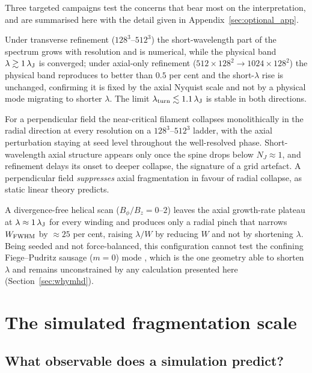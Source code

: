 \documentclass[usenatbib,twoside,twocolumn]{mnras}
\begin{document}
Three targeted campaigns test the concerns that bear most on the interpretation, and are summarised here with the detail given in Appendix~\ref{sec:optional_app}.

Under transverse refinement ($128^3$--$512^3$) the short-wavelength part of the spectrum grows with resolution and is numerical, while the physical band $\lambda\gtrsim1\,\lambda_{\rm J}$ is converged; under axial-only refinement ($512\times128^2\to1024\times128^2$) the physical band reproduces to better than $0.5$ per cent and the short-$\lambda$ rise is unchanged, confirming it is fixed by the axial Nyquist scale and not by a physical mode migrating to shorter $\lambda$. The limit $\lambda_{\rm turn}\lesssim1.1\,\lambda_{\rm J}$ is stable in both directions.

For a perpendicular field the near-critical filament collapses monolithically in the radial direction at every resolution on a $128^3$--$512^3$ ladder, with the axial perturbation staying at seed level throughout the well-resolved phase. Short-wavelength axial structure appears only once the spine drops below $N_J\approx1$, and refinement delays its onset to deeper collapse, the signature of a grid artefact. A perpendicular field \emph{suppresses} axial fragmentation in favour of radial collapse, as static linear theory predicts.

A divergence-free helical scan ($B_\phi/B_z=0$--$2$) leaves the axial growth-rate plateau at $\lambda\approx1\,\lambda_{\rm J}$ for every winding and produces only a radial pinch that narrows $W_{\rm FWHM}$ by $\approx25$ per cent, raising $\lambda/W$ by reducing $W$ and not by shortening $\lambda$. Being seeded and not force-balanced, this configuration cannot test the confining Fiege--Pudritz sausage ($m=0$) mode \citep{Fiege2000}, which is the one geometry able to shorten $\lambda$ and remains unconstrained by any calculation presented here (Section~\ref{sec:whymhd}).

\section{The simulated fragmentation scale}
\label{sec:validation_endtoend}

\subsection{What observable does a simulation predict?}
\label{sec:whatobservable}
\end{document}
